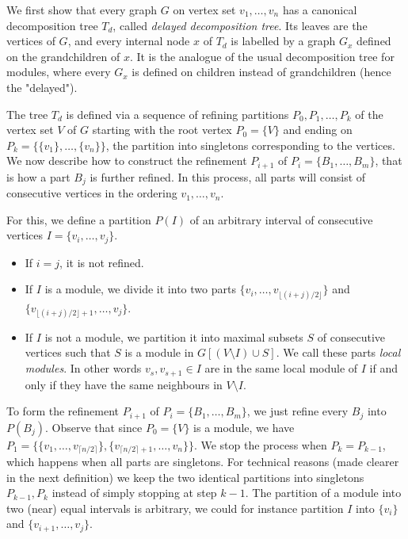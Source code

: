 \documentclass[11pt]{article}
\numberwithin{equation}{section}
\begin{document}
We first show that every graph $G$ on vertex set $v_1, \ldots, v_n$ has a canonical decomposition tree $T_d$, called \emph{delayed decomposition tree}. Its leaves are the vertices of $G$, and every internal node $x$ of $T_d$ is labelled by a graph $G_x$ defined on the grandchildren of $x$. It is the analogue of the usual decomposition tree for modules, where every $G_x$ is defined on children instead of grandchildren (hence the "delayed"). 

The tree $T_d$ is defined via a sequence of refining partitions $P_0,P_1,\dots ,P_k$ of the vertex set $V$ of $G$ starting with the root vertex $P_0=\{V\}$ and ending on $P_k=\{\{v_1\}, \ldots, \{v_n\}\}$, the partition into singletons corresponding to the vertices. We now describe how to construct the refinement $P_{i+1}$ of $P_i=\{B_1, \ldots, B_m\}$, that is how a part $B_j$ is further refined. In this process, all parts will consist of consecutive vertices in the ordering $v_1, \ldots, v_n$.

For this, we define a partition $P(I)$ of an arbitrary interval of consecutive vertices $I=\{v_i,\dots, v_j\}$.

\begin{itemize}
    \item If $i=j$, it is not refined.
    \item If $I$ is a module, we divide it into two parts $\{v_i,\dots ,v_{\lfloor (i+j)/2\rfloor}\}$ and $\{v_{\lfloor (i+j)/2\rfloor+1},\dots, v_j\}$.
    \item If $I$ is not a module, we partition it into maximal subsets $S$ of consecutive vertices such that $S$ is a module in $G[(V\setminus I)\cup S]$. We call these parts \emph{local modules}.
   In other words $v_s,v_{s+1}\in I$ are in the same local module of $I$ if and only if they have the same neighbours in $V\setminus I$.
\end{itemize}

 To form the refinement $P_{i+1}$ of $P_i=\{B_1, \ldots, B_m\}$, we just refine every $B_j$ into $P(B_j)$. Observe that since $P_0=\{V\}$ is a module, we have $P_1 = \{\{v_1, \ldots, v_{\lceil n/2 \rceil}\}, \{v_{\lceil n/2 \rceil + 1}, \ldots, v_n\}\}$. We stop the process when $P_k=P_{k-1}$, which happens when all parts are singletons. For technical reasons (made clearer in the next definition) we keep the two identical partitions into singletons $P_{k-1},P_k$ instead of simply stopping at step $k-1$. The partition of a module into two (near) equal intervals is arbitrary, we could for instance partition $I$ into $\{v_i\}$ and $\{v_{i+1},\dots, v_j\}$.
 
\end{document}
